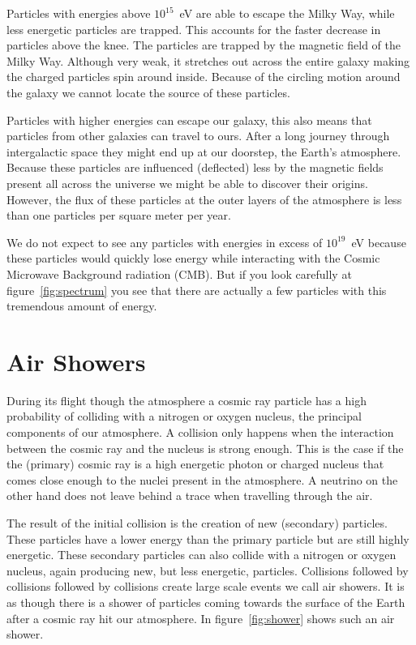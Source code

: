 Particles with energies above $10^{15}$~eV are able to escape the Milky Way, while less energetic particles are trapped. This accounts for the faster decrease in particles above the knee. The particles are trapped by the magnetic field of the Milky Way. Although very weak, it stretches out across the entire galaxy making the charged particles spin around inside. Because of the circling motion around the galaxy we cannot locate the source of these particles.

Particles with higher energies can escape our galaxy, this also means that particles from other galaxies can travel to ours. After a long journey through intergalactic space they might end up at our doorstep, the Earth's atmosphere. Because these particles are influenced (deflected) less by the magnetic fields present all across the universe we might be able to discover their origins. However, the flux of these particles at the outer layers of the atmosphere is less than one particles per square meter per year.

We do not expect to see any particles with energies in excess of $10^{19}$~eV because these particles would quickly lose energy while interacting with the Cosmic Microwave Background radiation (CMB). But if you look carefully at figure~\ref{fig:spectrum} you see that there are actually a few particles with this tremendous amount of energy.

\section{Air Showers}
During its flight though the atmosphere a cosmic ray particle has a high probability of colliding with a nitrogen or oxygen nucleus, the principal components of our atmosphere. A collision only happens when the interaction between the cosmic ray and the nucleus is strong enough. This is the case if the the (primary) cosmic ray is a high energetic photon or charged nucleus that comes close enough to the nuclei present in the atmosphere. A neutrino on the other hand does not leave behind a trace when travelling through the air.

The result of the initial collision is the creation of new (secondary) particles. These particles have a lower energy than the primary particle but are still highly energetic. These secondary particles can also collide with a nitrogen or oxygen nucleus, again producing new, but less energetic, particles. Collisions followed by collisions followed by collisions create large scale events we call air showers. It is as though there is a shower of particles coming towards the surface of the Earth after a cosmic ray hit our atmosphere. In figure~\ref{fig:shower} shows such an air shower.

